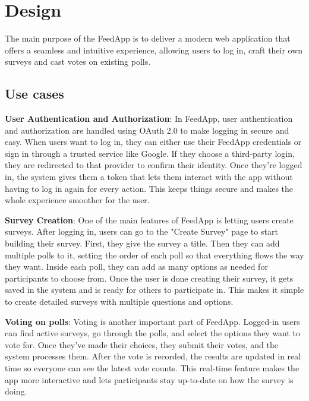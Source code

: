 \section{Design}
\label{sec:design}

The main purpose of the FeedApp is to deliver a modern web application that offers a seamless and intuitive experience, allowing users to log in, craft their own surveys and cast votes on existing polls.

\subsection{Use cases}
 \textbf{User Authentication and Authorization}:
In FeedApp, user authentication and authorization are handled using OAuth 2.0 to make logging in secure and easy. When users want to log in, they can either use their FeedApp credentials or sign in through a trusted service like Google. If they choose a third-party login, they are redirected to that provider to confirm their identity. Once they’re logged in, the system gives them a token that lets them interact with the app without having to log in again for every action. This keeps things secure and makes the whole experience smoother for the user.
\medskip

\noindent
 \textbf{Survey Creation}:
One of the main features of FeedApp is letting users create surveys. After logging in, users can go to the "Create Survey" page to start building their survey. First, they give the survey a title. Then they can add multiple polls to it, setting the order of each poll so that everything flows the way they want. Inside each poll, they can add as many options as needed for participants to choose from. Once the user is done creating their survey, it gets saved in the system and is ready for others to participate in. This makes it simple to create detailed surveys with multiple questions and options.
\medskip

\noindent
 \textbf{Voting on polls}:
Voting is another important part of FeedApp. Logged-in users can find active surveys, go through the polls, and select the options they want to vote for. Once they’ve made their choices, they submit their votes, and the system processes them. After the vote is recorded, the results are updated in real time so everyone can see the latest vote counts. This real-time feature makes the app more interactive and lets participants stay up-to-date on how the survey is doing.
\medskip


